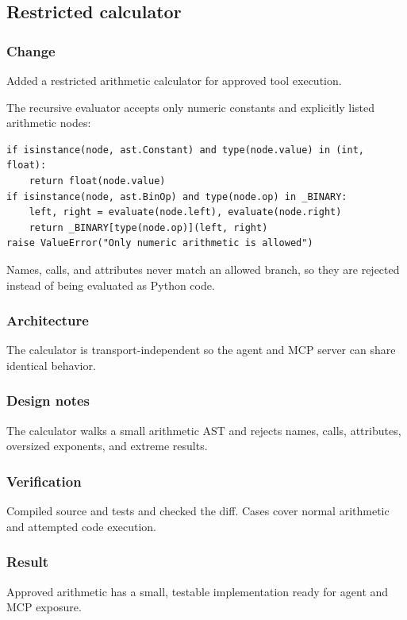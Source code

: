 
\subsection{Restricted calculator}


\subsubsection{Change}

Added a restricted arithmetic calculator for approved tool execution.

The recursive evaluator accepts only numeric constants and explicitly listed arithmetic nodes:

\begin{verbatim}
if isinstance(node, ast.Constant) and type(node.value) in (int, float):
    return float(node.value)
if isinstance(node, ast.BinOp) and type(node.op) in _BINARY:
    left, right = evaluate(node.left), evaluate(node.right)
    return _BINARY[type(node.op)](left, right)
raise ValueError("Only numeric arithmetic is allowed")
\end{verbatim}

Names, calls, and attributes never match an allowed branch, so they are rejected instead of being evaluated as Python code.

\subsubsection{Architecture}

The calculator is transport-independent so the agent and MCP server can share identical behavior.

\subsubsection{Design notes}

The calculator walks a small arithmetic AST and rejects names, calls, attributes, oversized exponents, and extreme results.

\subsubsection{Verification}

Compiled source and tests and checked the diff. Cases cover normal arithmetic and attempted code execution.

\subsubsection{Result}

Approved arithmetic has a small, testable implementation ready for agent and MCP exposure.

